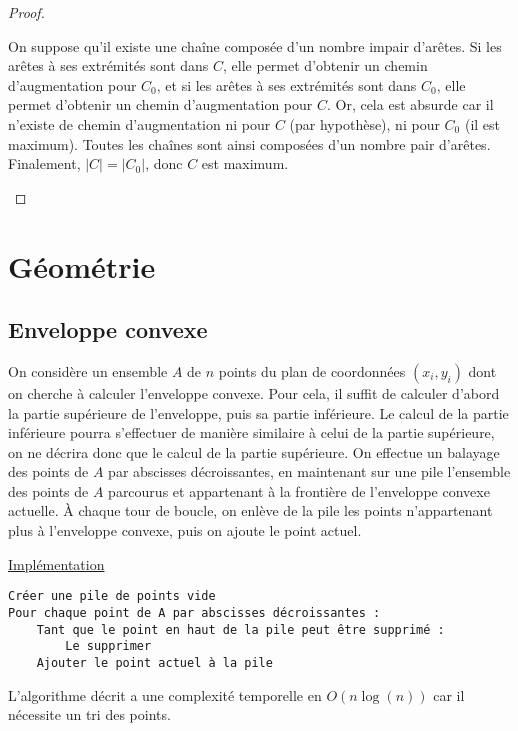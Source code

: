 \documentclass[11pt,a4paper]{article}
\begin{document}
\begin{proof}
\begin{itemize}
      On suppose qu'il existe une chaîne composée d'un nombre impair d'arêtes. Si les arêtes à ses extrémités sont dans \(C\), elle permet d'obtenir un chemin d'augmentation pour \(C_0\), et si les arêtes à ses extrémités sont dans \(C_0\), elle permet d'obtenir un chemin d'augmentation pour \(C\). Or, cela est absurde car il n'existe de chemin d'augmentation ni pour \(C\) (par hypothèse), ni pour \(C_0\) (il est maximum). Toutes les chaînes sont ainsi composées d'un nombre pair d'arêtes. Finalement, \(|C|=|C_0|\), donc \(C\) est maximum.

  \end{itemize}
\end{proof}


  \section{Géométrie}

    \subsection{Enveloppe convexe}

On considère un ensemble \(A\) de \(n\) points du plan de coordonnées \((x_i,y_i)\) dont on cherche à calculer l'enveloppe convexe. Pour cela, il suffit de calculer d'abord la partie supérieure de l'enveloppe, puis sa partie inférieure. Le calcul de la partie inférieure pourra s'effectuer de manière similaire à celui de la partie supérieure, on ne décrira donc que le calcul de la partie supérieure. On effectue un balayage des points de \(A\) par abscisses décroissantes, en maintenant sur une pile l'ensemble des points de \(A\) parcourus et appartenant à la frontière de l'enveloppe convexe actuelle. À chaque tour de boucle, on enlève de la pile les points n'appartenant plus à l'enveloppe convexe, puis on ajoute le point actuel.

\noindent\href{https://github.com/AdrienVannson/algo-lib/blob/master/include/geometry/convex-hull.hpp}{Implémentation}
\begin{lstlisting}
Créer une pile de points vide
Pour chaque point de A par abscisses décroissantes :
    Tant que le point en haut de la pile peut être supprimé :
        Le supprimer
    Ajouter le point actuel à la pile
\end{lstlisting}

L'algorithme décrit a une complexité temporelle en \(O(n \log(n) )\) car il nécessite un tri des points.
\end{document}
